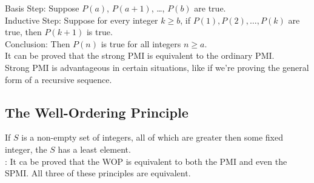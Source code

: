 \documentclass{report}
\begin{document}
Basis Step: Suppose $P(a)$, $P(a+1)$, \dots, $P(b)$ are true. \\
Inductive Step: Suppose for every integer $k\geq b$, if $P(1), P(2),\dots, P(k)$ are true, then $P(k+1)$ is true.\\
Conclusion: Then $P(n)$ is true for all integers $n\geq a$. \\

\Claim It can be proved that the strong PMI is equivalent to the ordinary PMI. \\
Strong PMI is advantageous in certain situations, like if we're proving the general form of a recursive sequence.


\subsection*{The Well-Ordering Principle}
If $S$ is a non-empty set of integers, all of which are greater then some fixed integer, the $S$ has a least element. \\

\Claim: It ca be proved that the WOP is equivalent to both the PMI and even the SPMI. All three of these principles are equivalent.
\end{document}
